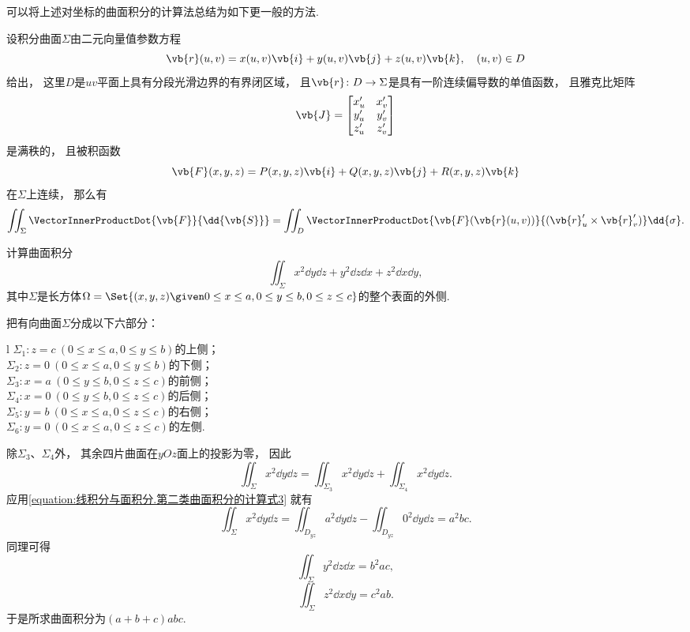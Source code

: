 可以将上述对坐标的曲面积分的计算法总结为如下更一般的方法.
\begin{theorem}
设积分曲面\(\Sigma\)由二元向量值参数方程\[
	\vb{r}(u,v) = x(u,v) \vb{i} + y(u,v) \vb{j} + z(u,v) \vb{k},
	\quad (u,v) \in D
\]给出，
这里\(D\)是\(uv\)平面上具有分段光滑边界的有界闭区域，
且\(\vb{r}\colon D \to \Sigma\)是具有一阶连续偏导数的单值函数，
且雅克比矩阵\[
	\vb{J} = \begin{bmatrix}
		x'_u & x'_v \\
		y'_u & y'_v \\
		z'_u & z'_v
	\end{bmatrix}
\]是满秩的，
且被积函数\[
	\vb{F}(x,y,z) = P(x,y,z) \vb{i} + Q(x,y,z) \vb{j} + R(x,y,z) \vb{k}
\]在\(\Sigma\)上连续，
那么有\begin{equation}
	\iint_\Sigma \VectorInnerProductDot{\vb{F}}{\dd{\vb{S}}}
	= \iint_D \VectorInnerProductDot{\vb{F}(\vb{r}(u,v))}{(\vb{r}'_u \times \vb{r}'_v)} \dd{\sigma}.
\end{equation}
\end{theorem}

\begin{example}
计算曲面积分\[
	\iint_\Sigma x^2 \dd{y}\dd{z} + y^2 \dd{z}\dd{x} + z^2 \dd{x}\dd{y},
\]
其中\(\Sigma\)是长方体\(\Omega = \Set{
	(x,y,z)
	\given
	0 \leq x \leq a,
	0 \leq y \leq b,
	0 \leq z \leq c
}\)的整个表面的外侧.
\begin{solution}
把有向曲面\(\Sigma\)分成以下六部分：
\begin{center}
	\begin{tblr}{l}
		\(\Sigma_1: z=c\ (0 \leq x \leq a, 0 \leq y \leq b)\)的上侧； \\
		\(\Sigma_2: z=0\ (0 \leq x \leq a, 0 \leq y \leq b)\)的下侧； \\
		\(\Sigma_3: x=a\ (0 \leq y \leq b, 0 \leq z \leq c)\)的前侧； \\
		\(\Sigma_4: x=0\ (0 \leq y \leq b, 0 \leq z \leq c)\)的后侧； \\
		\(\Sigma_5: y=b\ (0 \leq x \leq a, 0 \leq z \leq c)\)的右侧； \\
		\(\Sigma_6: y=0\ (0 \leq x \leq a, 0 \leq z \leq c)\)的左侧. \\
	\end{tblr}
\end{center}
除\(\Sigma_3\)、\(\Sigma_4\)外，
其余四片曲面在\(yOz\)面上的投影为零，
因此\[
	\iint_\Sigma x^2 \dd{y}\dd{z}
	= \iint_{\Sigma_3} x^2 \dd{y}\dd{z}
	+ \iint_{\Sigma_4} x^2 \dd{y}\dd{z}.
\]
应用\cref{equation:线积分与面积分.第二类曲面积分的计算式3} 就有\[
	\iint_\Sigma x^2 \dd{y}\dd{z}
	= \iint_{D_{yz}} a^2 \dd{y}\dd{z}
	- \iint_{D_{yz}} 0^2 \dd{y}\dd{z}
	= a^2 bc.
\]
同理可得\[
	\iint_\Sigma y^2 \dd{z}\dd{x}
	= b^2 ac,
\]\[
	\iint_\Sigma z^2 \dd{x}\dd{y}
	= c^2 ab.
\]
于是所求曲面积分为\((a+b+c) abc\).
\end{solution}
\end{example}

